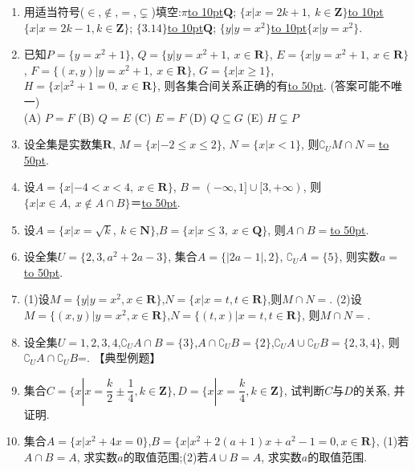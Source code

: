 \documentclass[10pt,a4paper]{article}
\newcommand{\blank}[1]{\underline{\hbox to #1pt{}}}
\begin{document}
\begin{enumerate}[1.]
\item 用适当符号($\in$,$\notin$,$=$,$\subsetneq$)填空:$\pi$\blank{10}$\mathbf{Q}$; $\{x|x=2k+1, \ k\in \mathbf{Z}\}$\blank{10}$\{x|x=2k-1,k\in \mathbf{Z}\}$; $\{3.14\}$\blank{10}$\mathbf{Q}$; $\{y|y=x^2\}$\blank{10}$\{x|y=x^2\}$.  
\item 已知$P=\{y=x^2+1\}$, $Q=\{y|y=x^2+1, \ x\in \mathbf{R}\}$, $E=\{x|y=x^2+1, \  x\in \mathbf{R}\}$, $F=\{(x,y)|y=x^2+1, \ x\in \mathbf{R}\}$, $G=\{x|x\ge 1\}$, $H=\{x|x^2+1=0, \ x\in \mathbf{R}\}$, 则各集合间关系正确的有\blank{50}. (答案可能不唯一)\\
(A) $P=F$   (B) $Q=E$   (C) $E=F$   (D) $Q\subseteq G$  (E) $H\subsetneq P$
\item 设全集是实数集$\mathbf{R}$, $M=\{x|-2 \le x\le 2\}$, $N=\{x|x<1\}$, 则$\complement_U M\cap N=$\blank{50}.
\item 设$A=\{x|-4<x<4, \ x\in \mathbf{R}\}$, $B=(-\infty,1]\cup [3,+\infty)$, 则$\{x|x\in A, \ x\notin A\cap B  \}$＝\blank{50}.
\item 设$A=\{x|x=\sqrt k, \ k\in \mathbf{N}\}$,$B=\{x|x\le 3,\ x\in \mathbf{Q}\}$, 则$A\cap B=$\blank{50}.
\item 设全集$U=\{2,3,a^2+2a-3\}$, 集合$A=\{|2a-1|,2\}$, $\complement_U A=\{5\}$, 则实数$a=$\blank{50}.
\item (1)设$M=\{ y|y={x^2},x\in \mathbf{R} \}$,$N=\{ x|x=t,t\in \mathbf{R} \}$,则$M\cap N=$.
(2)设$M=\{ (x,y)|y={x^2},x\in \mathbf{R} \}$,$N=\{ (t,x)|x=t,t\in \mathbf{R} \}$, 则$M\cap N=$.
\item 设全集$U={1, 2, 3, 4}$,$\complement {_U}A\cap B=\{ 3 \}$,$A\cap \complement {_U}B=\{ 2 \}$,$\complement {_U}A\cup \complement {_U}B=\{ 2,3,4 \}$, 则$\complement {_U}A\cap \complement {_U}B$=.
【典型例题】
\item 集合$C=\{ x| x=\dfrac k2\pm \dfrac14,k\in \mathbf{Z}  \},D=\{ x| x=\dfrac k4,k\in \mathbf{Z}  \}$, 试判断$C$与$D$的关系, 并证明.
\item 集合$A=\{x| {x^2}+4x=0 \}$,$B=\{x| {x^2}+2(a+1)x+{a^2}-1=0,x\in \mathbf{R}\}$, (1)若$A\cap B=A$, 求实数$a$的取值范围;(2)若$A\cup B=A$, 求实数$a$的取值范围.
 

\end{enumerate}
\end{document}
